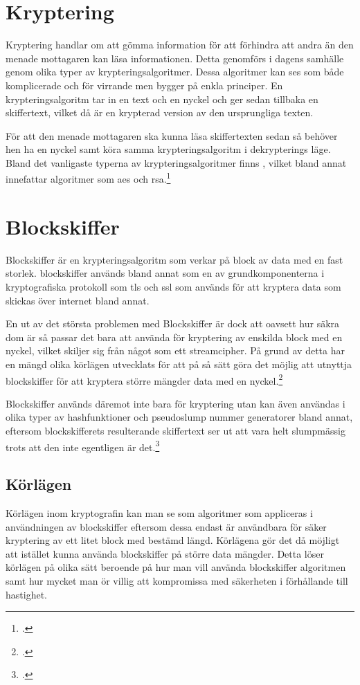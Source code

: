 
\section{Kryptering}
Kryptering handlar om att gömma information för att förhindra att andra än den menade mottagaren kan läsa informationen.
Detta genomförs i dagens samhälle genom olika typer av krypteringsalgoritmer. Dessa algoritmer kan ses som både komplicerade
och för virrande men bygger på enkla principer. En krypteringsalgoritm tar in en text och en nyckel och ger sedan tillbaka en
skiffertext, vilket då är en krypterad version av den ursprungliga texten.

För att den menade mottagaren ska kunna läsa skiffertexten sedan så behöver hen ha en nyckel samt köra samma krypteringsalgoritm
i dekrypterings läge. Bland det vanligaste typerna av krypteringsalgoritmer finns ,
vilket bland annat innefattar algoritmer som \acrshort{aes} och \gls{rsa}.\footcite{kryptering}

\section{Blockskiffer}
\label{sec:blockskiffer}
Blockskiffer är en krypteringsalgoritm som verkar på block av data med en fast storlek.
blockskiffer används bland annat som en av grundkomponenterna i kryptografiska protokoll som \acrfull{tls} och \acrfull{ssl}
som används för att kryptera data som skickas över internet bland annat.

En ut av det största problemen med Blockskiffer är dock att oavsett hur säkra dom är så passar det bara att använda
för kryptering av enskilda block med en nyckel, vilket skiljer sig från något som ett \gls{streamcipher}.
På grund av detta har en mängd olika körlägen utvecklats för att på så sätt göra det möjlig att utnyttja
blockskiffer för att kryptera större mängder data med en nyckel.\footcite{blockskiffer-ref}

Blockskiffer används däremot inte bara för kryptering utan kan även användas i olika typer av \gls{hashfunktion}er
och \gls{pseudoslump} nummer generatorer bland annat, eftersom blockskifferets resulterande skiffertext ser ut att vara helt slumpmässig
trots att den inte egentligen är det.\footcite{blockskiffer-ref}

\subsection{Körlägen}
Körlägen inom kryptografin kan man se som algoritmer som appliceras i användningen av
blockskiffer eftersom dessa endast är användbara för säker kryptering av ett litet block med bestämd längd.
Körlägena gör det då möjligt att istället kunna använda blockskiffer på större data mängder.
Detta löser körlägen på olika sätt beroende på hur man vill använda blockskiffer algoritmen samt hur
mycket man ör villig att kompromissa med säkerheten i förhållande till hastighet.

